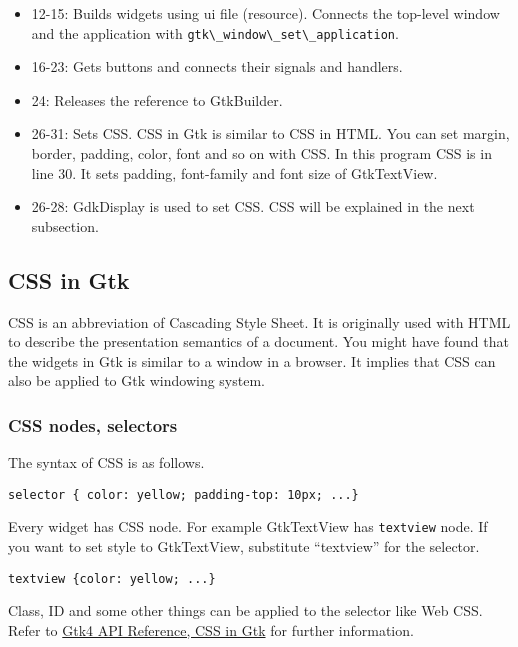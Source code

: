 \begin{itemize}
\tightlist
\item
  12-15: Builds widgets using ui file (resource). Connects the top-level
  window and the application with
  \passthrough{\lstinline!gtk\_window\_set\_application!}.
\item
  16-23: Gets buttons and connects their signals and handlers.
\item
  24: Releases the reference to GtkBuilder.
\item
  26-31: Sets CSS. CSS in Gtk is similar to CSS in HTML. You can set
  margin, border, padding, color, font and so on with CSS. In this
  program CSS is in line 30. It sets padding, font-family and font size
  of GtkTextView.
\item
  26-28: GdkDisplay is used to set CSS. CSS will be explained in the
  next subsection.
\end{itemize}

\hypertarget{css-in-gtk}{%
\subsection{CSS in Gtk}\label{css-in-gtk}}

CSS is an abbreviation of Cascading Style Sheet. It is originally used
with HTML to describe the presentation semantics of a document. You
might have found that the widgets in Gtk is similar to a window in a
browser. It implies that CSS can also be applied to Gtk windowing
system.

\hypertarget{css-nodes-selectors}{%
\subsubsection{CSS nodes, selectors}\label{css-nodes-selectors}}

The syntax of CSS is as follows.

\begin{lstlisting}
selector { color: yellow; padding-top: 10px; ...}
\end{lstlisting}

Every widget has CSS node. For example GtkTextView has
\passthrough{\lstinline!textview!} node. If you want to set style to
GtkTextView, substitute ``textview'' for the selector.

\begin{lstlisting}
textview {color: yellow; ...}
\end{lstlisting}

Class, ID and some other things can be applied to the selector like Web
CSS. Refer to \href{https://docs.gtk.org/gtk4/css-overview.html}{Gtk4
API Reference, CSS in Gtk} for further information.

